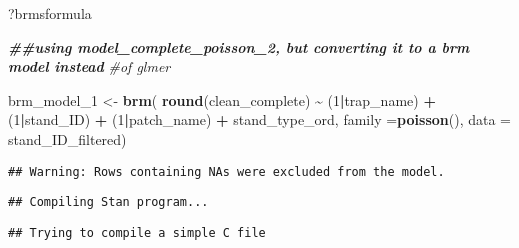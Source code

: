 \documentclass[
]{article}
\newenvironment{Shaded}{\begin{snugshade}}{\end{snugshade}}
\newcommand{\AttributeTok}[1]{\textcolor[rgb]{0.13,0.29,0.53}{#1}}
\newcommand{\CommentTok}[1]{\textcolor[rgb]{0.56,0.35,0.01}{\textit{#1}}}
\newcommand{\DecValTok}[1]{\textcolor[rgb]{0.00,0.00,0.81}{#1}}
\newcommand{\DocumentationTok}[1]{\textcolor[rgb]{0.56,0.35,0.01}{\textbf{\textit{#1}}}}
\newcommand{\FunctionTok}[1]{\textcolor[rgb]{0.13,0.29,0.53}{\textbf{#1}}}
\newcommand{\NormalTok}[1]{#1}
\newcommand{\OtherTok}[1]{\textcolor[rgb]{0.56,0.35,0.01}{#1}}
\newcommand{\SpecialCharTok}[1]{\textcolor[rgb]{0.81,0.36,0.00}{\textbf{#1}}}
\begin{document}
\begin{Shaded}
\begin{Highlighting}[]
\NormalTok{?brmsformula}

\DocumentationTok{\#\#using model\_complete\_poisson\_2, but converting it to a \textquotesingle{}brm\textquotesingle{} model instead}
\CommentTok{\#of \textquotesingle{}glmer\textquotesingle{}}

\NormalTok{brm\_model\_1 }\OtherTok{\textless{}{-}} \FunctionTok{brm}\NormalTok{(}
  \FunctionTok{round}\NormalTok{(clean\_complete) }\SpecialCharTok{\textasciitilde{}}\NormalTok{ (}\DecValTok{1}\SpecialCharTok{|}\NormalTok{trap\_name) }
  \SpecialCharTok{+}\NormalTok{ (}\DecValTok{1}\SpecialCharTok{|}\NormalTok{stand\_ID) }\SpecialCharTok{+} 
\NormalTok{    (}\DecValTok{1}\SpecialCharTok{|}\NormalTok{patch\_name) }\SpecialCharTok{+}\NormalTok{ stand\_type\_ord, }
  \AttributeTok{family =}\FunctionTok{poisson}\NormalTok{(), }\AttributeTok{data =}\NormalTok{ stand\_ID\_filtered)}
\end{Highlighting}
\end{Shaded}

\begin{verbatim}
## Warning: Rows containing NAs were excluded from the model.
\end{verbatim}

\begin{verbatim}
## Compiling Stan program...
\end{verbatim}

\begin{verbatim}
## Trying to compile a simple C file
\end{verbatim}
\end{document}

